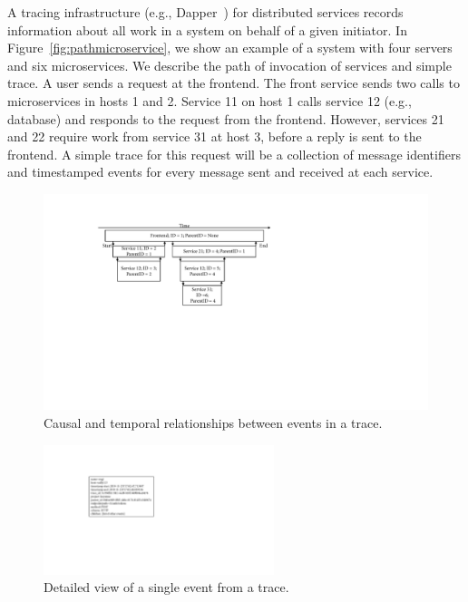 A tracing infrastructure (e.g., Dapper~\cite{sigelman2010dapper}) for distributed services records information about all work in a system on behalf of a given initiator. In Figure~\ref{fig:pathmicroservice}, we show an example of a system with four servers and six microservices. We describe the path of invocation of services and simple trace. A user sends a request at the frontend. The front service sends two calls to microservices in hosts 1 and 2. Service 11 on host 1 calls service 12 (e.g., database) and responds to the request from the frontend. However, services 21 and 22 require work from service 31 at host 3, before a reply is sent to the frontend. A simple trace for this request will be a collection of message identifiers and timestamped events for every message sent and received at each service.


\begin{figure}[!t]
\centerline{\includegraphics[width=1.0\textwidth]{gfx/chap2/tracetree.pdf}}
\caption{Causal and temporal relationships between events in a trace.}
\label{fig:temporalevents}
\end{figure}

\begin{figure}[!b]
\centerline{\includegraphics[width=0.6\textwidth]{gfx/chap2/single_event.pdf}}
\caption{Detailed view of a single event from a trace.}
\label{fig:singleevent}
\end{figure}


